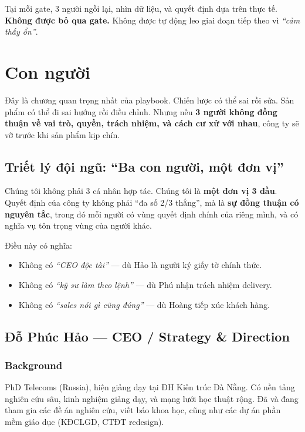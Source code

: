 \documentclass[11pt,a4paper]{article}
\begin{document}
\begin{warnbox}[title=Nguyên tắc decision gate]
Tại mỗi gate, 3 người ngồi lại, nhìn dữ liệu, và quyết định dựa trên thực tế.
\textbf{Không được bỏ qua gate.} Không được tự động leo giai đoạn tiếp theo vì
\textit{``cảm thấy ổn''}.
\end{warnbox}

\clearpage

\section{Con người}

Đây là chương quan trọng nhất của playbook. Chiến lược có thể sai rồi sửa.
Sản phẩm có thể đi sai hướng rồi điều chỉnh. Nhưng nếu \textbf{3 người không
đồng thuận về vai trò, quyền, trách nhiệm, và cách cư xử với nhau}, công ty
sẽ vỡ trước khi sản phẩm kịp chín.

\subsection{Triết lý đội ngũ: ``Ba con người, một đơn vị''}

\begin{quotebox}
Chúng tôi không phải 3 cá nhân hợp tác. Chúng tôi là \textbf{một đơn vị 3 đầu}.
Quyết định của công ty không phải ``đa số 2/3 thắng'', mà là \textbf{sự đồng thuận
có nguyên tắc}, trong đó mỗi người có vùng quyết định chính của riêng mình, và
có nghĩa vụ tôn trọng vùng của người khác.
\end{quotebox}

Điều này có nghĩa:
\begin{itemize}
\item Không có \textit{``CEO độc tài''} — dù Hảo là người ký giấy tờ chính thức.
\item Không có \textit{``kỹ sư làm theo lệnh''} — dù Phú nhận trách nhiệm delivery.
\item Không có \textit{``sales nói gì cũng đúng''} — dù Hoàng tiếp xúc khách hàng.
\end{itemize}

\subsection{Đỗ Phúc Hảo — CEO / Strategy \& Direction}

\subsubsection*{Background}
PhD Telecoms (Russia), hiện giảng dạy tại ĐH Kiến trúc Đà Nẵng. Có nền tảng
nghiên cứu sâu, kinh nghiệm giảng dạy, và mạng lưới học thuật rộng. Đã và đang
tham gia các đề án nghiên cứu, viết báo khoa học, cũng như các dự án phần mềm
giáo dục (KĐCLGD, CTĐT redesign).
\end{document}
